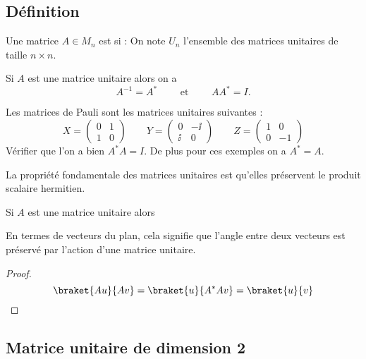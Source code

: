 \documentclass[11pt,class=report,crop=false]{standalone}
\begin{document}
\subsection{Définition}

\begin{definition}
Une matrice $A \in M_n$ est  si :
On note $U_n$ l'ensemble des matrices unitaires de taille $n \times n$.
\end{definition}

Si $A$ est une matrice unitaire alors on a 
$$A^{-1} = A^* \qquad \text{ et  }\qquad A A^* = I.$$

\begin{exemple}
Les matrices de Pauli sont les matrices unitaires suivantes :
$$
X = \begin{pmatrix}0&1\\1&0\end{pmatrix}
\qquad
Y = \begin{pmatrix}0&-\ii\\\ii&0\end{pmatrix}
\qquad
Z = \begin{pmatrix}1&0\\0&-1\end{pmatrix}
$$
Vérifier que l'on a bien $A^*A=I$. De plus pour ces exemples on a $A^*=A$.
\end{exemple}

La propriété fondamentale des matrices unitaires est qu'elles préservent le produit scalaire hermitien.
\begin{proposition}
Si $A$ est une matrice unitaire alors
\end{proposition}

En termes de vecteurs du plan, cela signifie que l'angle entre deux vecteurs est préservé par l'action d'une matrice unitaire.


\begin{proof}
$$
\braket{Au}{Av} 
= \braket{u}{A^*Av}
= \braket{u}{v}
$$
\end{proof}


\subsection{Matrice unitaire de dimension 2}
\end{document}
